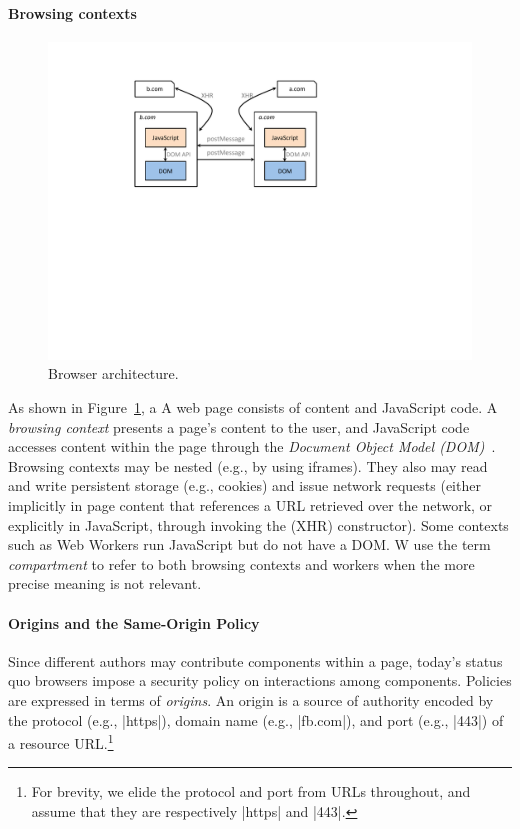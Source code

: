 \paragraph{Browsing contexts}
\iffigures
\begin{figure}
\begin{center}
\includegraphics[width=\columnwidth]{arch.pdf}
\end{center}
\vspace{-10pt}
\caption{\label{fig:primer-browser-arch} Browser architecture.}
\vspace{-10pt}
\end{figure}
As shown in Figure~\ref{fig:primer-browser-arch}, a \else A \fi web page
consists of content and JavaScript code.  A \emph{browsing context}
presents a page's content to the user, and JavaScript code accesses
content within the page through the \emph{Document Object Model
  (DOM)}~\cite{html5}. Browsing contexts may be nested (e.g., by using
iframes). They also may read and write persistent storage (e.g.,
cookies) and issue network requests (either implicitly in page content
that references a URL retrieved over the network, or explicitly in
JavaScript, through invoking the \xhr{} (XHR) constructor).  Some
contexts such as Web Workers run JavaScript but do not have a
DOM. W use the term \emph{compartment} to refer to both browsing
contexts and workers when the more precise meaning is not relevant.

\paragraph{Origins and the Same-Origin Policy}
Since different authors may contribute components within a page,
today's status quo browsers impose a security policy on interactions
among components. Policies are expressed in terms of \emph{origins}.
An origin is a source of authority encoded by the protocol (e.g.,
\js|https|), domain name (e.g., \js|fb.com|), and port (e.g., \js|443|)
of a resource URL.\footnote{For brevity, we elide the protocol and
  port from URLs throughout, and assume that they are respectively
  \js|https| and \js|443|.}

